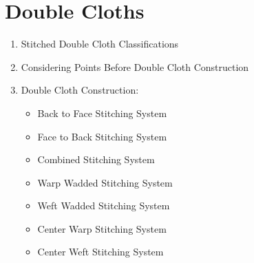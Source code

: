 \section{Double Cloths}

\begin{enumerate}[label=\textbf{\Alph*.}]
\item Stitched Double Cloth Classifications
\item Considering Points Before Double Cloth Construction
\item Double Cloth Construction:
\begin{itemize}
    \item Back to Face Stitching System
    \item Face to Back Stitching System
    \item Combined Stitching System
    \item Warp Wadded Stitching System
    \item Weft Wadded Stitching System
    \item Center Warp Stitching System
    \item Center Weft Stitching System
\end{itemize}
\end{enumerate}